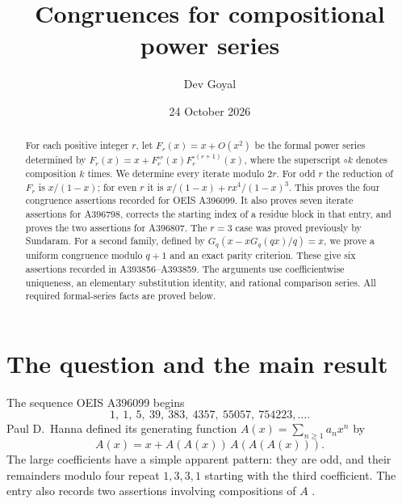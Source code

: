 \documentclass[11pt,a4paper]{article}
\title{Congruences for compositional power series}
\author{Dev Goyal}
\date{24 October 2026}
\theoremstyle{remark}
\begin{document}
\maketitle

\begin{center}
\end{center}

\begin{abstract}
For each positive integer $r$, let $F_r(x)=x+O(x^2)$ be the formal power
series determined by
$F_r(x)=x+F_r^{\circ r}(x)F_r^{\circ(r+1)}(x)$, where the superscript
$\circ k$ denotes composition $k$ times. We determine every iterate
modulo $2r$. For odd $r$ the reduction of $F_r$ is $x/(1-x)$; for even
$r$ it is $x/(1-x)+rx^4/(1-x)^3$. This proves the four congruence
assertions recorded for OEIS A396099. It also proves seven iterate
assertions for A396798, corrects the starting index of a residue block
in that entry, and proves the two assertions for A396807. The
$r=3$ case was proved previously by Sundaram. For a second family,
defined by $G_q(x-xG_q(qx)/q)=x$, we prove a uniform congruence modulo
$q+1$ and an exact parity criterion. These give six assertions
recorded in A393856--A393859. The arguments use
coefficientwise uniqueness, an elementary substitution identity, and
rational comparison series. All required formal-series facts are
proved below.
\end{abstract}

\section{The question and the main result}

The sequence OEIS A396099 begins
\[
1,\ 1,\ 5,\ 39,\ 383,\ 4357,\ 55057,\ 754223,\ldots.
\]
Paul D.\ Hanna defined its generating function $A(x)=\sum_{n\ge1}a_nx^n$
by
\begin{equation}\label{eq:a396099}
A(x)=x+A(A(x))\,A(A(A(x))).
\end{equation}
The large coefficients have a simple apparent pattern: they are odd,
and their remainders modulo four repeat $1,3,3,1$ starting with the
third coefficient. The entry also records two assertions involving
compositions of $A$ \cite{oeis099}.
\end{document}
